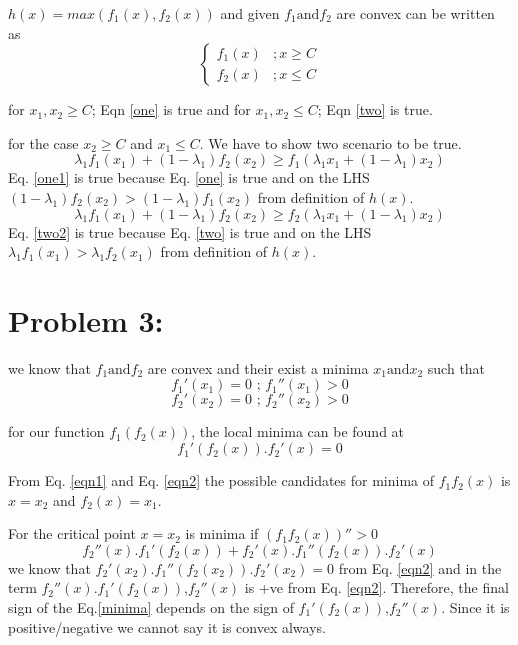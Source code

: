 \documentclass[5pt,a4paper]{article}
\begin{document}
	$h(x)=max(f_1(x),f_2(x))$ and given $f_1 \text{and} f_2$ are convex can be written as
	\[\begin{cases}
		f_1(x)&; x \geqslant C\\
		f_2(x)&; x \leqslant C
	\end{cases}
	\]
	
	for $x_1,x_2 \geqslant C$; Eqn \ref{one} is true and for $x_1,x_2 \leqslant C$; Eqn \ref{two} is true.
	
	for the case  $x_2 \geqslant C$ and $x_1 \leqslant C$. We have to show two scenario to be true.
	\begin{equation}
	\lambda_1 f_1(x_1)+(1-\lambda_1)f_2(x_2) \geqslant f_1(\lambda_1 x_1+(1-\lambda_1)x_2)
	\label{one1}
	\end{equation}
	Eq. \ref{one1} is true because Eq. \ref{one} is true and on the LHS $(1-\lambda_1)f_2(x_2) > (1-\lambda_1)f_1(x_2)$ from definition of $h(x)$.
	\begin{equation}
	\lambda_1 f_1(x_1)+(1-\lambda_1)f_2(x_2) \geqslant f_2(\lambda_1 x_1+(1-\lambda_1)x_2)
	\label{two2}
	\end{equation}
	Eq. \ref{two2} is true because Eq. \ref{two} is true and on the LHS $\lambda_1f_1(x_1) > \lambda_1f_2(x_1)$ from definition of $h(x)$.
	\section*{Problem 3:}
	we know that $f_1 \text{and} f_2$ are convex and their exist a minima $x_1 \text{and} x_2$ such that\\
	
	\begin{equation}
		f_1'(x_1)=0 \text{ ; } f_1''(x_1)>0
		\label{eqn1}
	\end{equation}
		\begin{equation}
	f_2'(x_2)=0 \text{ ; } f_2''(x_2)>0
	\label{eqn2}
	\end{equation}
	
	for our function $f_1(f_2(x))$, the local minima can be found at \\
	\begin{equation}
	f_1'(f_2(x)).f_2'(x)=0 
	\label{eqn3}
	\end{equation}
	
	From Eq. \ref{eqn1} and Eq. \ref{eqn2} the possible candidates for minima of $f_1f_2(x)$ is $x=x_2$ and $f_2(x)=x_1$.
	
	For the critical point  $x=x_2$ is minima if $(f_1f_2(x))''>0$
	\begin{equation}
	f_2''(x).f_1'(f_2(x))+f_2'(x).f_1''(f_2(x)).f_2'(x)
	\label{minima}
	\end{equation}
	we know that $f_2'(x_2).f_1''(f_2(x_2)).f_2'(x_2)=0$ from Eq. \ref{eqn2} and in the term $f_2''(x).f_1'(f_2(x))$,$f_2''(x)$ is +ve from Eq. \ref{eqn2}. Therefore, the final sign of the Eq.\ref{minima} depends on the sign of $f_1'(f_2(x))$,$f_2''(x)$. Since it is positive/negative we cannot say it is convex always.\\\\
	
\end{document}
